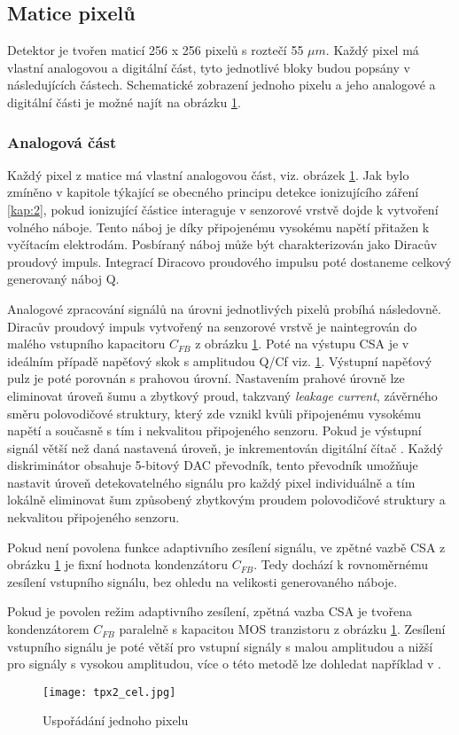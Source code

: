 \subsection{Matice pixelů}
Detektor je tvořen maticí 256 x 256 pixelů s roztečí  55 $\mu$$m$. Každý pixel má vlastní analogovou a digitální část, tyto jednotlivé bloky budou popsány v následujících částech. Schematické zobrazení jednoho pixelu a jeho analogové a digitální části je možné najít na obrázku \ref{fig:tpx2_cell}.
\subsubsection{Analogová část}	 
\label{analog}
Každý pixel z matice má vlastní analogovou část, viz. obrázek \ref{fig:tpx2_cell}. Jak bylo zmíněno v kapitole týkající se obecného principu detekce ionizujícího záření \ref{kap:2}, pokud ionizující částice interaguje v senzorové vrstvě dojde k vytvoření volného náboje. Tento náboj je díky připojenému vysokému napětí přitažen k vyčítacím elektrodám. Posbíraný náboj může být charakterizován jako Diracův proudový impuls. Integrací Diracovo proudového impulsu poté dostaneme celkový generovaný náboj Q. 
\par Analogové zpracování signálů na úrovni jednotlivých pixelů probíhá následovně. Diracův proudový impuls vytvořený na senzorové vrstvě je naintegrován do malého vstupního kapacitoru $C_{FB}$ z obrázku \ref{fig:tpx2_cell}. Poté na výstupu CSA je v ideálním případě napěťový skok s amplitudou Q/Cf viz. \ref{fig:tpx2_cell}. Výstupní napěťový pulz je poté porovnán s prahovou úrovní. Nastavením prahové úrovně lze eliminovat úroveň šumu a zbytkový proud, takzvaný \textit{leakage current}, závěrného směru polovodičové struktury, který zde vznikl kvůli připojenému vysokému napětí a současně s tím i nekvalitou připojeného senzoru. Pokud je výstupní signál větší než daná nastavená úroveň, je inkrementován digitální čítač \cite{Llopart}. Každý diskriminátor obsahuje 5-bitový DAC převodník, tento převodník umožňuje nastavit úroveň detekovatelného signálu pro každý pixel individuálně a tím lokálně eliminovat šum způsobený zbytkovým proudem polovodičové struktury a nekvalitou připojeného senzoru.
\par Pokud není povolena funkce adaptivního zesílení signálu, ve zpětné vazbě CSA z obrázku \ref{fig:tpx2_cell} je fixní hodnota kondenzátoru $C_{FB}$. Tedy dochází k rovnoměrnému zesílení vstupního signálu, bez ohledu na velikosti generovaného náboje. 
\par Pokud je povolen režim adaptivního zesílení, zpětná vazba CSA je tvořena kondenzátorem $C_{FB}$ paralelně s kapacitou MOS tranzistoru z obrázku \ref{fig:tpx2_cell}. Zesílení vstupního signálu je poté větší pro vstupní signály s malou amplitudou a nižší pro signály s vysokou amplitudou, více o této metodě lze dohledat například v \cite{MOS}.
\begin{figure}[h!]
	\centering
	\captionsetup{justification=centering}
	\texttt{[image: tpx2\_cel.jpg]}
	\caption{Uspořádání jednoho pixelu \cite{Timepix2}}
	\label{fig:tpx2_cell}
\end{figure}

